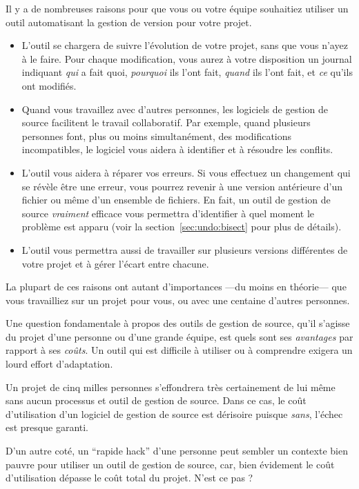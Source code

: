 Il y a de nombreuses raisons pour que vous ou votre équipe souhaitiez
utiliser un outil automatisant la gestion de version pour votre projet.
\begin{itemize}
\item L'outil se chargera de suivre l'évolution de votre projet, sans
que vous n'ayez à le faire. Pour chaque modification, vous aurez à votre
disposition un journal indiquant \emph{qui} a fait quoi, \emph{pourquoi}
ils l'ont fait, \emph{quand} ils l'ont fait, et \emph{ce} qu'ils ont
modifiés.
\item Quand vous travaillez avec d'autres personnes, les logiciels de 
gestion de source facilitent le travail collaboratif. Par exemple, quand
plusieurs personnes font, plus ou moins simultanément, des modifications
incompatibles, le logiciel vous aidera à identifier et à résoudre les conflits.
\item L'outil vous aidera à réparer vos erreurs. Si vous effectuez un changement
qui se révèle être une erreur, vous pourrez revenir à une version
antérieure d'un fichier ou même d'un ensemble de fichiers. En fait, un outil de
gestion de source \emph{vraiment} efficace vous permettra d'identifier à quel
moment le problème est apparu (voir la section~\ref{sec:undo:bisect} pour plus
de détails).
\item L'outil vous permettra aussi de travailler sur plusieurs versions différentes
de votre projet et à gérer l'écart entre chacune.
\end{itemize}
La plupart de ces raisons ont autant d'importances ---du moins en théorie--- que
vous travailliez sur un projet pour vous, ou avec une centaine d'autres
personnes.

Une question fondamentale à propos des outils de gestion de source, qu'il s'agisse
du projet d'une personne ou d'une grande équipe, est quels sont ses  
\emph{avantages} par rapport à ses \emph{coûts}. Un outil qui est difficile à 
utiliser ou à comprendre exigera un lourd effort d'adaptation.

Un projet de cinq milles personnes s'effondrera très certainement de lui même
sans aucun processus et outil de gestion de source. Dans ce cas, le coût 
d'utilisation d'un logiciel de gestion de source est dérisoire puisque 
\emph{sans}, l'échec est presque garanti.

D'un autre coté, un ``rapide hack'' d'une personne peut sembler un contexte
bien pauvre pour utiliser un outil de gestion de source, car, bien évidement
le coût d'utilisation dépasse le coût total du projet. N'est ce pas ?

